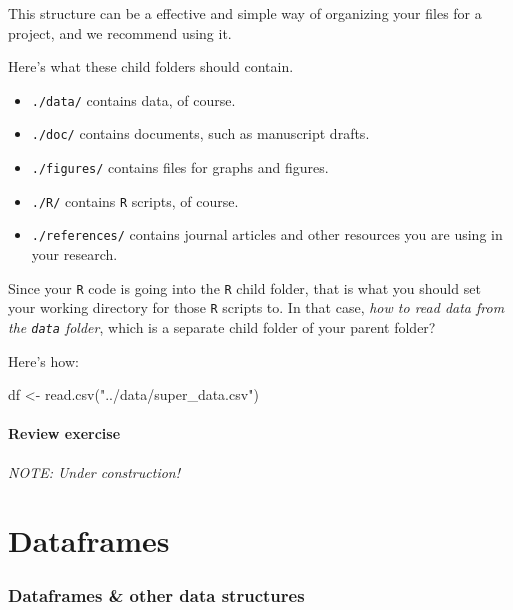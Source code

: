 \documentclass[
]{book}
\newenvironment{Shaded}{\begin{snugshade}}{\end{snugshade}}
\newcommand{\FunctionTok}[1]{\textcolor[rgb]{0.00,0.00,0.00}{#1}}
\newcommand{\NormalTok}[1]{#1}
\newcommand{\OtherTok}[1]{\textcolor[rgb]{0.56,0.35,0.01}{#1}}
\newcommand{\StringTok}[1]{\textcolor[rgb]{0.31,0.60,0.02}{#1}}
\providecommand{\tightlist}{%
  \setlength{\itemsep}{0pt}\setlength{\parskip}{0pt}}
\begin{document}
This structure can be a effective and simple way of organizing your files for a project, and we recommend using it.

Here's what these child folders should contain.

\begin{itemize}
\tightlist
\item
  \texttt{./data/} contains data, of course.
\item
  \texttt{./doc/} contains documents, such as manuscript drafts.
\item
  \texttt{./figures/} contains files for graphs and figures.
\item
  \texttt{./R/} contains \texttt{R} scripts, of course.
\item
  \texttt{./references/} contains journal articles and other resources you are using in your research.
\end{itemize}

Since your \texttt{R} code is going into the \texttt{R} child folder, that is what you should set your working directory for those \texttt{R} scripts to. In that case, \emph{how to read data from the \texttt{data} folder}, which is a separate child folder of your parent folder?

Here's how:

\begin{Shaded}
\begin{Highlighting}[]
\NormalTok{df }\OtherTok{\textless{}{-}} \FunctionTok{read.csv}\NormalTok{(}\StringTok{"../data/super\_data.csv"}\NormalTok{)}
\end{Highlighting}
\end{Shaded}

\hypertarget{review-exercise}{%
\subsubsection*{Review exercise}\label{review-exercise}}

\emph{NOTE: Under construction!}

\hypertarget{dataframes}{%
\chapter{Dataframes}\label{dataframes}}

\hypertarget{dataframes-other-data-structures}{%
\subsection*{Dataframes \& other data structures}\label{dataframes-other-data-structures}}
\end{document}
